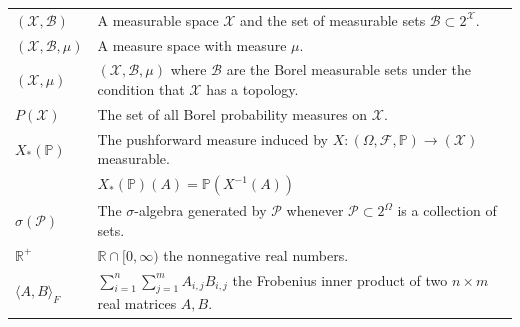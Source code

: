 \documentclass[11pt]{amsart}
\theoremstyle{definition}                  %
\theoremstyle{remark}                      %
\begin{document}
{\renewcommand\arraystretch{1.0}
\noindent\begin{longtable}{@{}l @{\quad-\quad} l@{}}
    $(\mathcal{X}, \mathcal{B})$ & A measurable space $\mathcal{X}$ and the set of measurable sets $ \mathcal{B} \subset 2^{ \mathcal{X}}$. \\
    $(\mathcal{X}, \mathcal{B}, \mu)$ & A measure space with measure $\mu$. \\
    $(\mathcal{X}, \mu)$ & $(\mathcal{X}, \mathcal{B},\mu)$ where $ \mathcal{B}$ are the Borel measurable sets under the condition that $\mathcal{X}$ has a topology.\\
    $P( \mathcal{X})$ & The set of all Borel probability measures on $\mathcal{X}$.\\
    $X_*( \mathbb{P})$ & The pushforward measure induced by $X: (\Omega, \mathcal{F}, \mathbb{P}) \rightarrow ( \mathcal{X})$ measurable.\\
                       & $X_*( \mathbb{P})(A) = \mathbb{P}(X^{-1}(A))$\\
    $\sigma(\mathcal{P})$ & The $\sigma$-algebra generated by $\mathcal{P}$ whenever $\mathcal{P} \subset 2^{\Omega}$ is a collection of sets.\\
    $ \mathbb{R}^{+}$ & $ \mathbb{R} \cap [0,\infty)$ the nonnegative real numbers.\\
    $\langle A, B \rangle_F$ & $\sum_{i=1}^{n} \sum_{j=1}^{m} A_{i,j} B_{i,j}$ the Frobenius inner product of two $n \times m$ real matrices $A,B$.
\end{longtable}}
\end{document}

